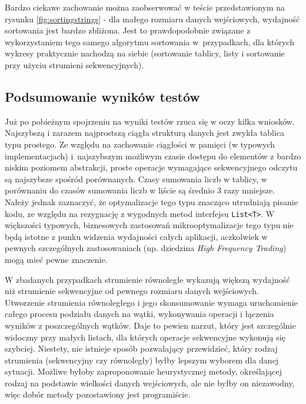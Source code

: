 \documentclass[12pt,twoside,openright]{extarticle}
\begin{document}
    Bardzo ciekawe zachowanie można zaobserwować w teście przedstawionym na rysunku \ref{fig:sortingstrings} - dla małego rozmiaru danych wejściowych, wydajność sortowania jest bardzo zbliżona. Jest to prawdopodobnie związane z wykorzystaniem tego samego algorytmu sortowania w~przypadkach, dla których wykresy praktycznie nachodzą na siebie (sortowanie tablicy, listy i sortowanie przy użyciu strumieni sekwencyjnych).

\newpage

\subsection{Podsumowanie wyników testów}

    Już po pobieżnym spojrzeniu na wyniki testów rzuca się w oczy kilka wniosków. Najszybszą i zarazem najprostszą ciągła strukturą danych jest zwykła tablica typu prostego. Ze względu na zachowanie ciągłości w pamięci (w typowych implementacjach) i~najszybszym możliwym czasie dostępu do elementów z bardzo niskim poziomem abstrakcji, proste operacje wymagające sekwencyjnego odczytu są najszybsze spośród porównanych. Czasy sumowania liczb w tablicy, w porównaniu do czasów sumowania liczb w liście są średnio 3 razy mniejsze. Należy jednak zaznaczyć, że optymalizacje tego typu znacząco utrudniają pisanie kodu, ze względu na rezygnację z wygodnych metod interfejsu \texttt{List<T>}. W większości typowych, biznesowych zastosowań mikrooptymalizacje tego typu nie będą istotne z punku widzenia wydajności całych aplikacji, aczkolwiek w pewnych szczególnych zastosowaniach (np. dziedzina \textit{High Frequency Trading}) mogą mieć pewne znaczenie.

    W zbadanych przypadkach strumienie równoległe wykazują większą wydajność niż strumienie sekwencyjne od pewnego rozmiaru danych wejściowych. Utworzenie strumienia równoległego i jego skonsumowanie wymaga uruchomienie całego procesu podziału danych na wątki, wykonywania operacji i łączenia wyników z poszczególnych wątków. Daje to pewien narzut, który jest szczególnie widoczny przy małych listach, dla których operacje sekwencyjne wykonują się szybciej. Niestety, nie istnieje sposób pozwalający przewidzieć, który rodzaj strumienia (sekwencyjny czy równoległy) byłby lepszym wyborem dla danej sytuacji. Możliwe byłoby zaproponowanie heurystycznej metody, określającej rodzaj na podstawie wielkości danych wejściowych, ale nie byłby on niezawodny, więc dobór metody pozostawiony jest programiście.
\end{document}
